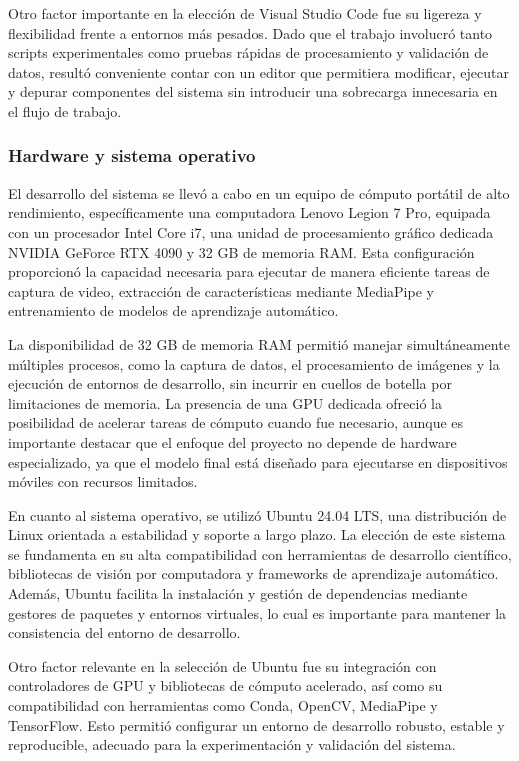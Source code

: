 	Otro factor importante en la elección de Visual Studio Code fue su ligereza y flexibilidad frente a entornos más pesados. Dado que el trabajo involucró tanto scripts experimentales como pruebas rápidas de procesamiento y validación de datos, resultó conveniente contar con un editor que permitiera modificar, ejecutar y depurar componentes del sistema sin introducir una sobrecarga innecesaria en el flujo de trabajo.
	
	\subsubsection{Hardware y sistema operativo}
	
	El desarrollo del sistema se llevó a cabo en un equipo de cómputo portátil de alto rendimiento, específicamente una computadora Lenovo Legion 7 Pro, equipada con un procesador Intel Core i7, una unidad de procesamiento gráfico dedicada NVIDIA GeForce RTX 4090 y 32 GB de memoria RAM. Esta configuración proporcionó la capacidad necesaria para ejecutar de manera eficiente tareas de captura de video, extracción de características mediante MediaPipe y entrenamiento de modelos de aprendizaje automático.
	
	La disponibilidad de 32 GB de memoria RAM permitió manejar simultáneamente múltiples procesos, como la captura de datos, el procesamiento de imágenes y la ejecución de entornos de desarrollo, sin incurrir en cuellos de botella por limitaciones de memoria. La presencia de una GPU dedicada ofreció la posibilidad de acelerar tareas de cómputo cuando fue necesario, aunque es importante destacar que el enfoque del proyecto no depende de hardware especializado, ya que el modelo final está diseñado para ejecutarse en dispositivos móviles con recursos limitados.
	
	En cuanto al sistema operativo, se utilizó Ubuntu 24.04 LTS, una distribución de Linux orientada a estabilidad y soporte a largo plazo. La elección de este sistema se fundamenta en su alta compatibilidad con herramientas de desarrollo científico, bibliotecas de visión por computadora y frameworks de aprendizaje automático. Además, Ubuntu facilita la instalación y gestión de dependencias mediante gestores de paquetes y entornos virtuales, lo cual es importante para mantener la consistencia del entorno de desarrollo.
	
	Otro factor relevante en la selección de Ubuntu fue su integración con controladores de GPU y bibliotecas de cómputo acelerado, así como su compatibilidad con herramientas como Conda, OpenCV, MediaPipe y TensorFlow. Esto permitió configurar un entorno de desarrollo robusto, estable y reproducible, adecuado para la experimentación y validación del sistema.
	
